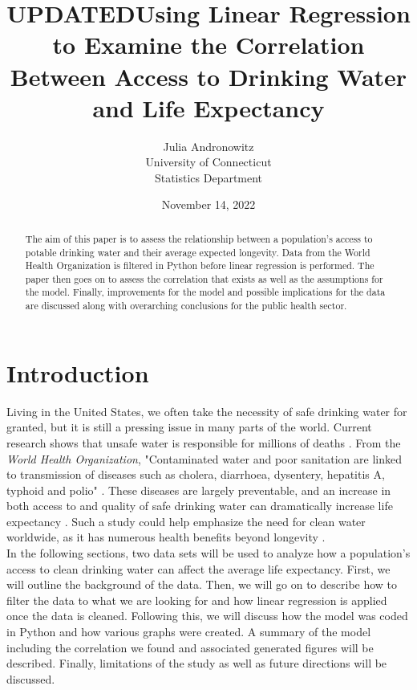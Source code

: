 \documentclass[12pt]{article}
\title{UPDATEDUsing Linear Regression to Examine the Correlation Between Access to Drinking Water and Life Expectancy}
\author{Julia Andronowitz\\
University of Connecticut\\Statistics Department}
\date{November 14, 2022}
\begin{document}
\maketitle

\begin{abstract}

The aim of this paper is to assess the relationship between a population's access to potable drinking water and their average expected longevity. Data from the World Health Organization is filtered in Python before linear regression is performed. The paper then goes on to assess the correlation that exists as well as the assumptions for the model. Finally, improvements for the model and possible implications for the data are discussed along with overarching conclusions for the public health sector.

\end{abstract}

\section{Introduction}

Living in the United States, we often take the necessity of safe drinking water for granted, but it is still a pressing issue in many parts of the world. Current research shows that unsafe water is responsible for millions of deaths \citep{ritchieroser2019water}. From the \textit{World Health Organization}, "Contaminated water and poor sanitation are linked to transmission of diseases such as cholera, diarrhoea, dysentery, hepatitis A, typhoid and polio" \citep{who2017water}. These diseases are largely preventable, and an increase in both access to and quality of safe drinking water can dramatically increase life expectancy \citep{angelakis2021quality}. Such a study could help emphasize the need for clean water worldwide, as it has numerous health benefits beyond longevity \citep{popkin2010waterhealth}. \\

In the following sections, two data sets will be used to analyze how a population's access to clean drinking water can affect the average life expectancy. First, we will outline the background of the data. Then, we will go on to describe how to filter the data to what we are looking for and how linear regression is applied once the data is cleaned. Following this, we will discuss how the model was coded in Python and how various graphs were created. A summary of the model including the correlation we found and associated generated figures will be described. Finally, limitations of the study as well as future directions will be discussed.
\end{document}
